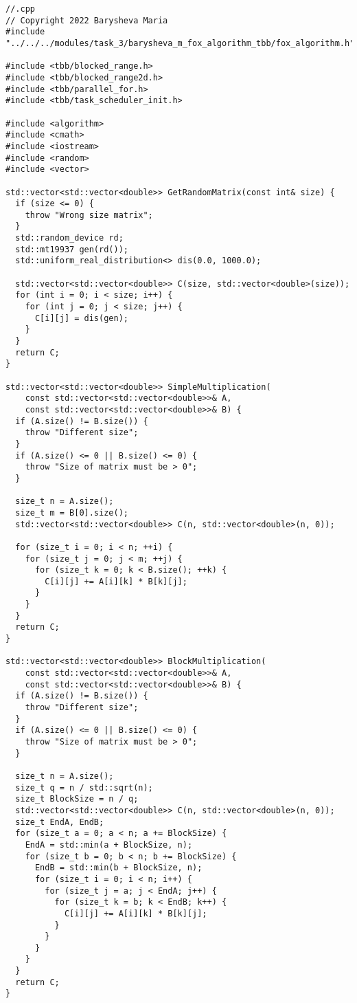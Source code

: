 \documentclass[12pt]{article}
\begin{document}
\begin{lstlisting}
//.cpp
// Copyright 2022 Barysheva Maria
#include "../../../modules/task_3/barysheva_m_fox_algorithm_tbb/fox_algorithm.h"

#include <tbb/blocked_range.h>
#include <tbb/blocked_range2d.h>
#include <tbb/parallel_for.h>
#include <tbb/task_scheduler_init.h>

#include <algorithm>
#include <cmath>
#include <iostream>
#include <random>
#include <vector>

std::vector<std::vector<double>> GetRandomMatrix(const int& size) {
  if (size <= 0) {
    throw "Wrong size matrix";
  }
  std::random_device rd;
  std::mt19937 gen(rd());
  std::uniform_real_distribution<> dis(0.0, 1000.0);

  std::vector<std::vector<double>> C(size, std::vector<double>(size));
  for (int i = 0; i < size; i++) {
    for (int j = 0; j < size; j++) {
      C[i][j] = dis(gen);
    }
  }
  return C;
}

std::vector<std::vector<double>> SimpleMultiplication(
    const std::vector<std::vector<double>>& A,
    const std::vector<std::vector<double>>& B) {
  if (A.size() != B.size()) {
    throw "Different size";
  }
  if (A.size() <= 0 || B.size() <= 0) {
    throw "Size of matrix must be > 0";
  }

  size_t n = A.size();
  size_t m = B[0].size();
  std::vector<std::vector<double>> C(n, std::vector<double>(n, 0));

  for (size_t i = 0; i < n; ++i) {
    for (size_t j = 0; j < m; ++j) {
      for (size_t k = 0; k < B.size(); ++k) {
        C[i][j] += A[i][k] * B[k][j];
      }
    }
  }
  return C;
}

std::vector<std::vector<double>> BlockMultiplication(
    const std::vector<std::vector<double>>& A,
    const std::vector<std::vector<double>>& B) {
  if (A.size() != B.size()) {
    throw "Different size";
  }
  if (A.size() <= 0 || B.size() <= 0) {
    throw "Size of matrix must be > 0";
  }

  size_t n = A.size();
  size_t q = n / std::sqrt(n);
  size_t BlockSize = n / q;
  std::vector<std::vector<double>> C(n, std::vector<double>(n, 0));
  size_t EndA, EndB;
  for (size_t a = 0; a < n; a += BlockSize) {
    EndA = std::min(a + BlockSize, n);
    for (size_t b = 0; b < n; b += BlockSize) {
      EndB = std::min(b + BlockSize, n);
      for (size_t i = 0; i < n; i++) {
        for (size_t j = a; j < EndA; j++) {
          for (size_t k = b; k < EndB; k++) {
            C[i][j] += A[i][k] * B[k][j];
          }
        }
      }
    }
  }
  return C;
}


\end{lstlisting}
\end{document}
